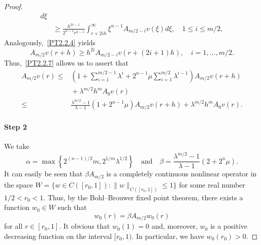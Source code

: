 \documentclass[11pt]{amsart}
\theoremstyle{definition}
\numberwithin{equation}{section}
\begin{document}
\begin{proof}
\begin{align*}
	d\xi
	\\
	&
	{}
	\ge
	\frac{
		h^{2 i - 1}
	}{
		2^{n - 1}
		r^{n - 1}
	}
	\int_{r + 2 i h}^\infty
	\xi^{n - 1}
	A_{m / 2 - i} v (\xi)
	d\xi,
	\quad
	1 \le i \le m / 2,
\end{align*}
Analogously,~\eqref{PT2.2.4} yields
$$
	A_{m / 2} v (r + h)
	\ge
	h^{2 i}
	A_{m / 2 - i} v (r + (2 i + 1) h),
	\quad
	i = 1, \ldots, m / 2.
$$
Thus,~\eqref{PT2.2.7} allows us to assert that
\begin{align}
	A_{m / 2} v (r)
	\le
	{}
	&
	\left(
		1
		+
		\sum_{i = 1}^{m / 2 - 1}
		\lambda^i
		+
		2^{n - 1}
		\mu
		\sum_{i = 1}^{m / 2}
		\lambda^{i - 1}
	\right)
	A_{m / 2} v (r + h)
	\label{PT2.2.8}
	\\
	&
	{}
	+
	\lambda^{m / 2}
	h^m
	A_0 v (r)
	\nonumber
	\\
	{}
	\le
	{}
	&
	\frac{
		\lambda^{m / 2} - 1
	}{
		\lambda - 1
	}
	(1 + 2^{n - 1} \mu)
	A_{m / 2} v (r + h)
	+
	\lambda^{m / 2}
	h^m
	A_0 v (r).
	\nonumber
\end{align}

\paragraph{Step 2}
We take
\begin{equation}
	\alpha 
	= 
	\max
	\left\{
		2^{(n - 1) / 2}
		m,
		2^{1 / m}
		\lambda^{1 / 2}
	\right\}
	\quad
	\mbox{and}
	\quad
	\beta 
	=
	\frac{
		\lambda^{m / 2} - 1
	}{
		\lambda - 1
	}
	(2 + 2^n \mu).
	\label{PT2.2.9}
\end{equation}
It can easily be seen that $\beta A_{m/2}$ is a completely continuous nonlinear operator in the space 
$
	W 
	= 
	\{
		w \in C ([r_0, 1])
		:
		\| w \|_{
			C ([r_0, 1])
		}
		\le
		1
	\}
$
for some real number $1 / 2 < r_0 < 1$.
Thus, by the Bohl--Brouwer fixed point theorem, there exists a function $w_0 \in W$ such that 
\begin{equation}
	w_0 (r)
	=
	\beta 
	A_{m / 2} w_0 (r)
	\label{PT2.2.10}
\end{equation}
for all $r \in [r_0, 1]$.
It obvious that  $w_0 (1) = 0$ and, moreover, $w_0$ is a positive decreasing function on the interval $[r_0, 1)$. In particular, we have $w_0 (r_0) > 0$.


\end{proof}
\end{document}
